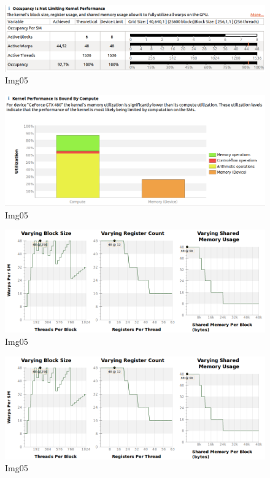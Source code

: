 \documentclass[a4paper]{article}
\begin{document}
\begin{figure}[ht]
    \centering
    \includegraphics[width=0.7\linewidth]{profiling/darker/darker_06_occupancy}
    \caption{Img05}
    \label{fig:histo}
\end{figure}
\FloatBarrier

\begin{figure}[ht]
    \centering
    \includegraphics[width=0.7\linewidth]{profiling/darker/darker_utilization_00}
    \caption{Img05}
    \label{fig:histo}
\end{figure}
\FloatBarrier

\begin{figure}[ht]
    \centering
    \includegraphics[width=0.7\linewidth]{profiling/darker/darker_varying}
    \caption{Img05}
    \label{fig:histo}
\end{figure}
\FloatBarrier



\begin{figure}[ht]
    \centering
    \includegraphics[width=0.7\linewidth]{profiling/darker/darker_varying}
    \caption{Img05}
    \label{fig:histo}
\end{figure}
\FloatBarrier

\printbibliography 
\end{document}
